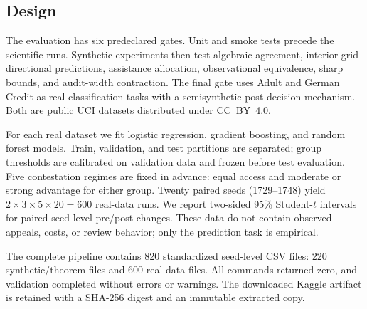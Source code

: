 \documentclass[manuscript,screen,review]{jair}
\begin{document}
\subsection{Design}

The evaluation has six predeclared gates.  Unit and smoke tests precede the
scientific runs.  Synthetic experiments then test algebraic agreement,
interior-grid directional predictions, assistance allocation, observational
equivalence, sharp bounds, and audit-width contraction.  The final gate uses
Adult \citep{becker1996adult} and German Credit
\citep{hofmann1994german} as real classification tasks with a semisynthetic
post-decision mechanism.  Both are public UCI datasets distributed under
CC~BY~4.0.

For each real dataset we fit logistic regression, gradient boosting, and
random forest models.  Train, validation, and test partitions are separated;
group thresholds are calibrated on validation data and frozen before test
evaluation.  Five contestation regimes are fixed in advance: equal access and
moderate or strong advantage for either group.  Twenty paired seeds
(1729--1748) yield
$2\times3\times5\times20=600$ real-data runs.  We report two-sided 95\%
Student-$t$ intervals for paired seed-level pre/post changes.  These data do
not contain observed appeals, costs, or review behavior; only the prediction
task is empirical.

The complete pipeline contains 820 standardized seed-level CSV files: 220
synthetic/theorem files and 600 real-data files.  All commands returned zero,
and validation completed without errors or warnings.  The downloaded Kaggle
artifact is retained with a SHA-256 digest and an immutable extracted copy.
\end{document}
